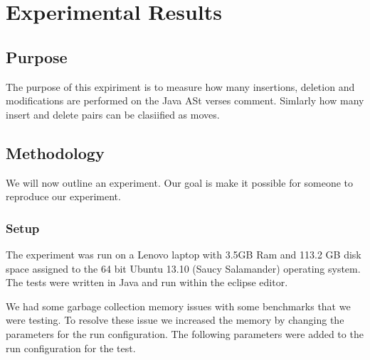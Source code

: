 
\chapter{Experimental Results}

\section{Purpose}
The purpose of this expiriment is to measure how many insertions, deletion and modifications are performed on the Java ASt verses comment. Simlarly how many insert and delete pairs can be clasiified as moves. 


\section{Methodology}
We will now outline an experiment. Our goal is make it possible for someone to reproduce our experiment.

\subsection{Setup}
The experiment was run on a Lenovo laptop with 3.5GB Ram and 113.2 GB disk space assigned to the 64 bit Ubuntu 13.10 (Saucy Salamander) operating system. The tests were written in Java and run within the eclipse editor.

  

We had some garbage collection memory issues with some benchmarks that we were testing. To resolve these issue we increased the memory by changing the parameters for the run configuration.  The following parameters were added to the run configuration for the test.

